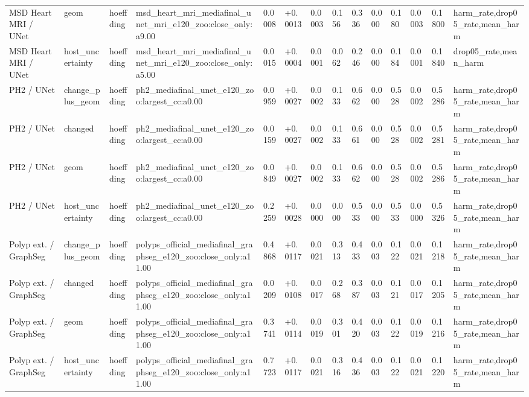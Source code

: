 \begin{table}[t]
\begin{tabular}{llllllllllllll}
MSD Heart MRI / UNet & geom & hoeffding & msd\_heart\_mri\_mediafinal\_unet\_mri\_e120\_zoo:close\_only:a9.00 & 0.0008 & +0.0013 & 0.0003 & 0.156 & 0.336 & 0.000 & 0.180 & 0.0003 & 0.1800 & harm\_rate,drop05\_rate,mean\_harm \\
MSD Heart MRI / UNet & host\_uncertainty & hoeffding & msd\_heart\_mri\_mediafinal\_unet\_mri\_e120\_zoo:close\_only:a5.00 & 0.0015 & +0.0004 & 0.0001 & 0.062 & 0.246 & 0.000 & 0.184 & 0.0001 & 0.1840 & drop05\_rate,mean\_harm \\
PH2 / UNet & change\_plus\_geom & hoeffding & ph2\_mediafinal\_unet\_e120\_zoo:largest\_cc:a0.00 & 0.0959 & +0.0027 & 0.0002 & 0.133 & 0.662 & 0.000 & 0.528 & 0.0002 & 0.5286 & harm\_rate,drop05\_rate,mean\_harm \\
PH2 / UNet & changed & hoeffding & ph2\_mediafinal\_unet\_e120\_zoo:largest\_cc:a0.00 & 0.0159 & +0.0027 & 0.0002 & 0.133 & 0.661 & 0.000 & 0.528 & 0.0002 & 0.5281 & harm\_rate,drop05\_rate,mean\_harm \\
PH2 / UNet & geom & hoeffding & ph2\_mediafinal\_unet\_e120\_zoo:largest\_cc:a0.00 & 0.0849 & +0.0027 & 0.0002 & 0.133 & 0.662 & 0.000 & 0.528 & 0.0002 & 0.5286 & harm\_rate,drop05\_rate,mean\_harm \\
PH2 / UNet & host\_uncertainty & hoeffding & ph2\_mediafinal\_unet\_e120\_zoo:largest\_cc:a0.00 & 0.2259 & +0.0028 & 0.0000 & 0.000 & 0.533 & 0.000 & 0.533 & 0.0000 & 0.5326 & harm\_rate,drop05\_rate,mean\_harm \\
Polyp ext. / GraphSeg & change\_plus\_geom & hoeffding & polyps\_official\_mediafinal\_graphseg\_e120\_zoo:close\_only:a11.00 & 0.4868 & +0.0117 & 0.0021 & 0.313 & 0.433 & 0.003 & 0.122 & 0.0021 & 0.1218 & harm\_rate,drop05\_rate,mean\_harm \\
Polyp ext. / GraphSeg & changed & hoeffding & polyps\_official\_mediafinal\_graphseg\_e120\_zoo:close\_only:a11.00 & 0.0209 & +0.0108 & 0.0017 & 0.268 & 0.387 & 0.003 & 0.121 & 0.0017 & 0.1205 & harm\_rate,drop05\_rate,mean\_harm \\
Polyp ext. / GraphSeg & geom & hoeffding & polyps\_official\_mediafinal\_graphseg\_e120\_zoo:close\_only:a11.00 & 0.3741 & +0.0114 & 0.0019 & 0.301 & 0.420 & 0.003 & 0.122 & 0.0019 & 0.1216 & harm\_rate,drop05\_rate,mean\_harm \\
Polyp ext. / GraphSeg & host\_uncertainty & hoeffding & polyps\_official\_mediafinal\_graphseg\_e120\_zoo:close\_only:a11.00 & 0.7723 & +0.0117 & 0.0021 & 0.316 & 0.436 & 0.003 & 0.122 & 0.0021 & 0.1220 & harm\_rate,drop05\_rate,mean\_harm \\

\end{tabular}
\end{table}
